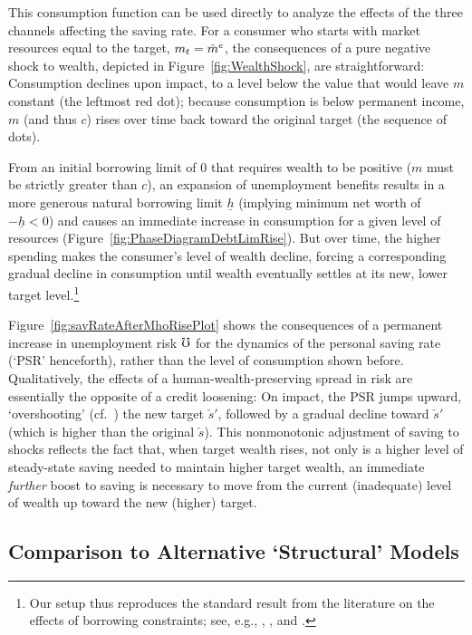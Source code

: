 \documentclass[titlepage]{\econtex}
\begin{document}
This consumption function can be used directly to analyze the effects of the three channels affecting the saving rate.  For a consumer who starts with market resources equal to the target, $m_{t}=\check{m}^{e}$, the consequences of a pure negative shock to wealth, depicted in Figure~\ref{fig:WealthShock}, are straightforward: Consumption declines upon impact, to a level below the value that would leave $m$ constant (the leftmost red dot); because consumption is below permanent income, $m$ (and thus $c$) rises over time back toward the original target (the sequence of dots).

From an initial borrowing limit of 0 that requires wealth to be positive ($m$ must be strictly greater than $c$), an expansion of unemployment benefits results in a more generous natural borrowing limit $\underline{h}$ (implying minimum net worth of $-\underline{h}<0$) and causes an immediate increase in consumption for a given level of resources (Figure~\ref{fig:PhaseDiagramDebtLimRise}).  But over time, the higher spending makes the consumer's level of wealth decline, forcing a corresponding gradual decline in consumption until wealth eventually settles at its new, lower target level.\footnote{Our setup thus reproduces the standard result from the literature on the effects of borrowing constraints; see, e.g., \cite{carroll:atheoryjep}, \cite{mue07}, \cite{glLiq} and \cite{hall:slump}.}

Figure~\ref{fig:savRateAfterMhoRisePlot} shows the consequences of a permanent increase in unemployment risk $\mho$ for the dynamics of the personal saving rate (`PSR' henceforth), rather than the level of consumption shown before.  Qualitatively, the effects of a human-wealth-preserving spread in risk are essentially the opposite of a credit loosening: On impact, the PSR jumps upward, `overshooting' (cf.\ \cite{dornbuschOvershooting}) the new target $\check{s}'$, followed by a gradual decline toward $\check{s}'$ (which is higher than the original $\check{s}$). This nonmonotonic adjustment of saving to shocks reflects the fact that, when target wealth rises, not only is a higher level of steady-state saving needed to maintain higher target wealth, an immediate \textit{further} boost to saving is necessary to move from the current (inadequate) level of wealth up toward the new (higher) target.

\hypertarget{ssAltModels}{}\hypertarget{Comparison-with-Alternative-Frameworks}{}

\subsection{Comparison to Alternative `Structural' Models} \label{ssAltModels}
\end{document}
